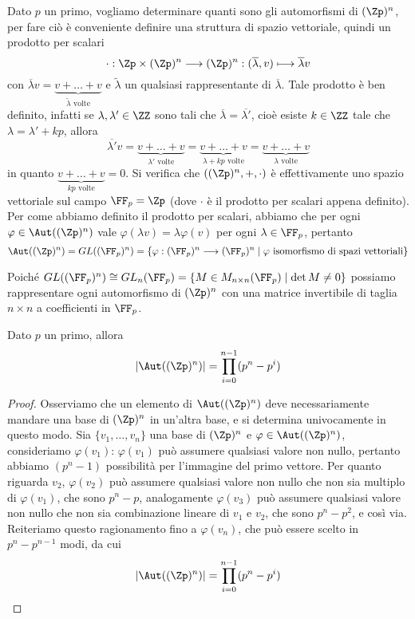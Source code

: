 \documentclass[11pt]{scrartcl}
\begin{document}
Dato $p$ un primo, vogliamo determinare quanti sono gli automorfismi di 
$(\Zp)^n$, per fare ciò è conveniente definire una struttura di spazio vettoriale,
quindi un prodotto per scalari\[
    \cdot:\Zp\times (\Zp)^n \longrightarrow (\Zp)^n : 
    (\overline{\lambda}, v)\longmapsto \overline{\lambda}v
\]
con $\overline{\lambda}v = \underset{\tilde{\lambda}\text{ volte}}{\underbrace{v + \ldots + v}}$
e $\tilde{\lambda}$ un qualsiasi rappresentante di $\overline{\lambda}$.
Tale prodotto è ben definito, infatti se $\lambda, \lambda' \in \ZZ$ sono tali che
$\overline{\lambda} = \overline{\lambda'}$, cioè esiste $k \in \ZZ$ tale che
$\lambda = \lambda' + kp$, allora \[
    \overline{\lambda'} v = \underset{\lambda'\text{ volte}}{\underbrace{v + \ldots + v}} = 
    \underset{\lambda + kp\text{ volte}}{\underbrace{v + \ldots + v}} = 
    \underset{\lambda\text{ volte}}{\underbrace{v + \ldots + v}}
\]in quanto $\underset{kp\text{ volte}}{\underbrace{v + \ldots + v}} = 0$. 
Si verifica che $((\Zp)^n, +, \cdot)$ è effettivamente uno spazio vettoriale
sul campo $\FF_p = \Zp$ (dove $\cdot$ è il prodotto per scalari appena definito).
Per come abbiamo definito il prodotto per scalari, abbiamo che per ogni
$\varphi \in \Aut((\Zp)^n)$ vale $\varphi(\lambda v) = \lambda\varphi(v)$ 
per ogni $\lambda \in \FF_p$, pertanto
\[
    \Aut((\Zp)^n) = GL((\FF_p)^n) = \{\varphi: (\FF_p)^n\longrightarrow(\FF_p)^n
    \mid\varphi\text{ isomorfismo di spazi vettoriali}\}
\]

Poiché $GL((\FF_p)^n) \cong GL_n(\FF_p) = \{M \in M_{n\times n}(\FF_p)\mid \det M \neq 0\}$
possiamo rappresentare ogni automorfismo di $(\Zp)^n$ con una matrice invertibile
di taglia $n\times n$ a coefficienti in $\FF_p$.

\begin{proposition}
Dato $p$ un primo, allora \[
    |\Aut((\Zp)^n)| = \prod_{i = 0}^{n - 1} (p^n - p^i)
    \]
\end{proposition}

\begin{proof}
    Osserviamo che un elemento di $\Aut((\Zp)^n)$ deve necessariamente mandare 
    una base di $(\Zp)^n$ in un'altra base, e si determina univocamente in questo 
    modo. Sia $\{v_1, \ldots, v_n\}$ una base di $(\Zp)^n$ e $\varphi \in 
    \Aut((\Zp)^n)$, consideriamo $\varphi(v_1)$: $\varphi(v_1)$ può assumere
    qualsiasi valore non nullo, pertanto abbiamo $(p^n - 1)$ possibilità per 
    l'immagine del primo vettore. Per quanto riguarda $v_2$, $\varphi(v_2)$
    può assumere qualsiasi valore non nullo che non sia multiplo di $\varphi(v_1)$,
    che sono $p^n - p$, analogamente $\varphi(v_3)$ può assumere qualsiasi
    valore non nullo che non sia combinazione lineare di $v_1$ e $v_2$, che sono
    $p^n - p^2$, e così via. Reiteriamo questo ragionamento fino a $\varphi(v_n)$,
    che può essere scelto in $p^n - p^{n - 1}$ modi, da cui \[
        |\Aut((\Zp)^n)| = \prod_{i = 0}^{n - 1}(p^n - p^i)
    \]
\end{proof}
\end{document}
